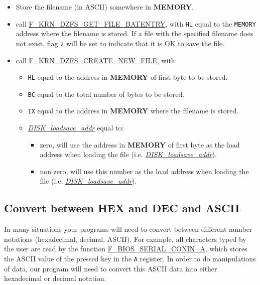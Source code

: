     \begin{itemize}
        \item Store the filename (in ASCII) somewhere in \textbf{MEMORY}.
        \item call \hyperref[func:fkrndzfsgetfilebatentry]{F\_KRN\_DZFS\_GET\_FILE\_BATENTRY},
            with \texttt{HL} equal to the \texttt{MEMORY} address where the
            filename is stored. If a file with the specified filename does not
            exist, flag \texttt{z} will be set to indicate that it is OK to save
            the file.
        \item call \hyperref[func:fkrndzfscreatenewfile]{F\_KRN\_DZFS\_CREATE\_NEW\_FILE},
            with:
            \begin{itemize}
                \item \texttt{HL} equal to the address in \textbf{MEMORY} of
                first byte to be stored.
                \item \texttt{BC} equal to the total number of bytes to
                be stored.
                \item \texttt{IX} equal to the address in \textbf{MEMORY}
                where the filename is stored.
                \item \textit{\hyperref[sec:ram_memmap]{DISK\_loadsave\_addr}}
                equal to:
                \begin{itemize}
                    \item zero, will use the address in \textbf{MEMORY} of first
                    byte as the load address when loading the file (i.e. 
                    \textit{\hyperref[sec:ram_memmap]{DISK\_loadsave\_addr}}).
                    \item non zero, will use this number as the load address
                    when loading the file (i.e. 
                    \textit{\hyperref[sec:ram_memmap]{DISK\_loadsave\_addr}}).
                \end{itemize}
            \end{itemize}
    \end{itemize}

    \subsection{Convert between HEX and DEC and ASCII}
    In many situations your programs will need to convert between different
    number notations (hexadecimal, decimal, ASCII). For example, all characters
    typed by the user are read by the function
    \hyperref[func:fbiosserialconina]{F\_BIOS\_SERIAL\_CONIN\_A}, which stores
    the ASCII value of the pressed key in the \texttt{A} register. In order to
    do manipulations of data, our program will need to convert this ASCII data
    into either hexadecimal or decimal notation.

